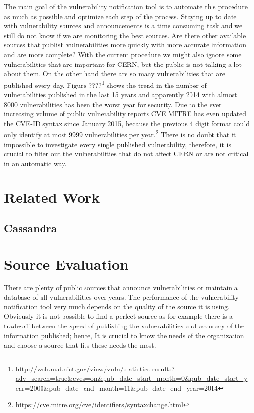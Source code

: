 The main goal of the vulnerability notification tool is to automate this procedure as much as possible and optimize each step of the process. 
Staying up to date with vulnerability sources and announcements is a time consuming task and we still do not know if we are monitoring the best sources. Are there other available sources that publish vulnerabilities more quickly with more accurate information and are more complete? With the current procedure we might also ignore some vulnerabilities that are important for CERN, but the public is not talking a lot about them. 
On the other hand there are so many vulnerabilities that are published every day. Figure ????\footnote{\url{http://web.nvd.nist.gov/view/vuln/statistics-results?adv_search=true&cves=on&pub_date_start_month=0&pub_date_start_year=2000&pub_date_end_month=11&pub_date_end_year=2014}} shows the trend in the number of vulnerabilities published in the last 15 years and apparently 2014 with almost 8000 vulnerabilities has been the worst year for security. Due to the ever increasing volume of public vulnerability reports CVE MITRE has even updated the CVE-ID syntax since January 2015, because the previous 4 digit format could only identify at most 9999 vulnerabilities per year.\footnote{\url {https://cve.mitre.org/cve/identifiers/syntaxchange.html}} There is no doubt that it impossible to investigate every single published vulnerability, therefore, it is crucial to filter out the vulnerabilities that do not affect CERN or are not critical in an automatic way.

\section{Related Work}

\subsection{Cassandra}

\section{Source Evaluation}

There are plenty of public sources that announce vulnerabilities or maintain a database of all vulnerabilities over years. The performance of the vulnerability notification tool very much depends on the quality of the source it is using. Obviously it is not possible to find a perfect source as for example there is a trade-off between the speed of publishing the vulnerabilities and accuracy of the information published; hence, It is crucial to know the needs of the organization and choose a source that fits these needs the most.

